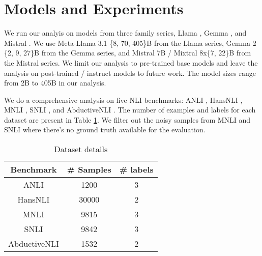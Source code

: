 \section{Models and Experiments}

We run our analyis on models from three family series, Llama \citep{dubey2024llama}, Gemma \citep{team2024gemma}, and Mistral \citep{jiang2023mistral, jiang2024mixtral}. We use Meta-Llama 3.1 \{8, 70, 405\}B from the Llama series, Gemma 2 \{2, 9, 27\}B from the Gemma series, and Mistral 7B / Mixtral 8x\{7, 22\}B from the Mistral series. We limit our analysis to pre-trained base models and leave the analysis on post-trained / instruct models to future work. The model sizes range from 2B to 405B in our analysis.

We do a comprehensive analysis on five NLI benchmarks: ANLI \citep{nie-etal-2020-adversarial}, HansNLI \citep{mccoy-etal-2019-right}, MNLI \citep{williams-etal-2018-broad}, SNLI \citep{bowman-etal-2015-large}, and AbductiveNLI \citep{bhagavatula2020abductive}. The number of examples and labels for each dataset are present in Table \ref{tab:dataset}. We filter out the noisy samples from MNLI and SNLI where there's no ground truth available for the evaluation.

\begin{table}
  \centering
  \begin{tabular}{c|c|c}
    Benchmark & \# Samples & \# labels \\
    \hline
    ANLI & 1200 & 3 \\
    HansNLI & 30000 & 2 \\
    MNLI & 9815 & 3 \\
    SNLI & 9842 & 3 \\
    AbductiveNLI & 1532 & 2 \\
  \end{tabular}
\caption{Dataset details}
\label{tab:dataset}
\end{table}
